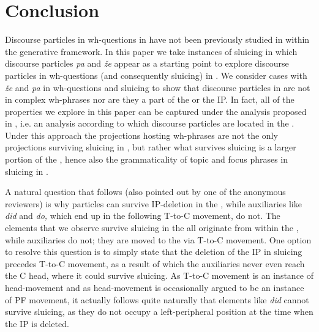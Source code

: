 \documentclass[output=paper,modfonts,newtxmath,hidelinks]{langscibook}
\begin{document}
\section{Conclusion}\label{9:s5}
Discourse particles in wh-questions in  have not been previously studied in  within the generative framework. In this paper we take instances of sluicing in which discourse particles \textit{pa} and \textit{že} appear as a starting point to explore discourse particles in wh-questions (and consequently sluicing) in . We consider cases with \textit{že} and \textit{pa} in wh-questions and sluicing to show that discourse particles in  are not in complex wh-phrases nor are they a part of the  or the IP. In fact, all of the properties we explore in this paper can be captured under the analysis proposed in \cite{marusicetal2015}, i.e. an analysis according to which discourse particles are located in the . Under this approach the projections hosting wh-phrases are not the only projections surviving sluicing in , but rather what survives sluicing is a larger portion of the , hence also the grammaticality of topic and focus phrases in sluicing in .\largerpage[2]

A natural question that follows (also pointed out by one of the anonymous reviewers) is why particles can survive IP-deletion in the , while auxiliaries like \textit{did} and \textit{do,} which end up in the  following T-to-C movement, do not. The elements that we observe survive sluicing in the  all originate from within the , while  auxiliaries do not; they are moved to the  via T-to-C movement. One option to resolve this question is to simply state that the deletion of the IP in sluicing precedes T-to-C movement, as a result of which the auxiliaries never even reach the C head, where it could survive sluicing. As T-to-C movement is an instance of head-movement and as head-movement is occasionally argued to be an instance of PF movement, it actually follows quite naturally that elements like \textit{did} cannot survive sluicing, as they do not occupy a left-peripheral position at the time when the IP is deleted.
\end{document}
